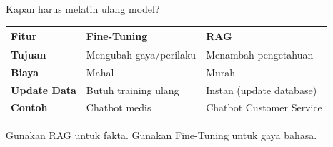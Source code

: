 Kapan harus melatih ulang model?

\begin{center}
\begin{tabular}{|l|l|l|}
\hline
\textbf{Fitur} & \textbf{Fine-Tuning} & \textbf{RAG} \\
\hline
\textbf{Tujuan} & Mengubah gaya/perilaku & Menambah pengetahuan \\
\hline
\textbf{Biaya} & Mahal & Murah \\
\hline
\textbf{Update Data} & Butuh training ulang & Instan (update database) \\
\hline
\textbf{Contoh} & Chatbot medis & Chatbot Customer Service \\
\hline
\end{tabular}
\end{center}

\begin{tipbox}
Gunakan RAG untuk fakta. Gunakan Fine-Tuning untuk gaya bahasa.
\end{tipbox}
